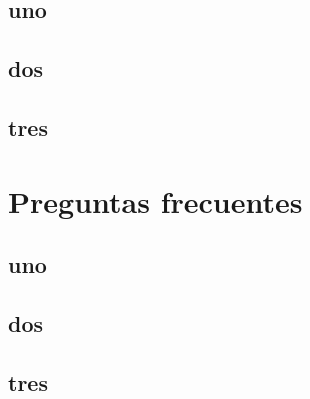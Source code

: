 \documentclass[12pt]{article}
\begin{document}
		\subsection{uno}
		\newpage
		\subsection{dos}
		\newpage
		\subsection{tres}
		\newpage

    \section{Preguntas frecuentes}
    \newpage
		\subsection{uno}
		\newpage
		\subsection{dos}
		\newpage
		\subsection{tres}
		\newpage
\end{document}

